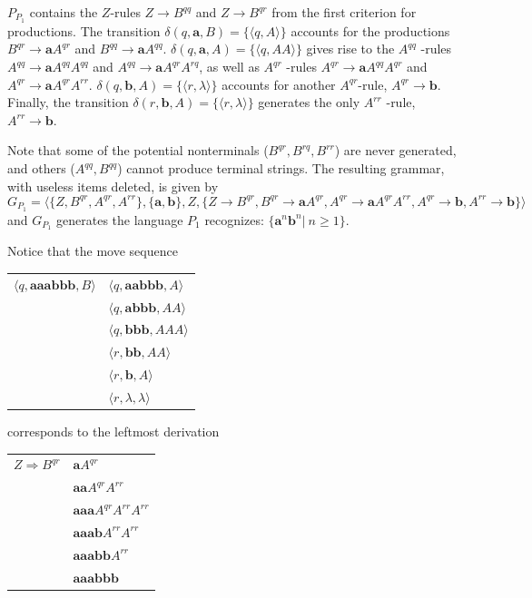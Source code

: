 $P_{P_1}$ contains the $Z$-rules $Z\rightarrow B^{qq}$ and $Z\rightarrow B^{qr}$
from the first criterion for productions. The transition $\delta(q,\pmb{a},B) =
\{\langle q,A\rangle\}$ accounts for the productions $B^{qr}\rightarrow\pmb{a}
A^{qr}$ and $B^{qq}\rightarrow\pmb{a}A^{qq}$. $\delta(q,\pmb{a},A)=\{\langle q,
AA\rangle\}$ gives rise to the $A^{qq}$ -rules $A^{qq}\rightarrow\pmb{a}A^{qq}A^{qq}$ and $A^{qq}\rightarrow\pmb{a}A^{qr}A^{rq}$, as well as $A^{qr}$ -rules
$A^{qr}\rightarrow\pmb{a}A^{qq}A^{qr}$ and $A^{qr}\rightarrow\pmb{a}A^{qr}A^{rr}$.
$\delta(q,\pmb{b},A)=\{\langle r,\lambda\rangle\}$ accounts for another
$A^{qr}$-rule, $A^{qr}\rightarrow\pmb{b}$. Finally, the transition $\delta(r,
\pmb{b},A)=\{\langle r,\lambda\rangle\}$ generates the only $A^{rr}$ -rule,
$A^{rr}\rightarrow\pmb{b}$.

Note that some of the potential nonterminals ($B^{qr} , B^{rq} , B^{rr}$) are never
generated, and others ($A^{qq} , B^{qq}$) cannot produce terminal strings. The
resulting grammar, with useless items deleted, is given by
\[ G_{P_1}=\langle\{Z,B^{qr},A^{qr},A^{rr}\},\{\pmb{a},\pmb{b}\},Z,\{Z
	\rightarrow B^{qr},B^{qr}\rightarrow\pmb{a}A^{qr},A^{qr}\rightarrow
	\pmb{a}A^{qr}A^{rr},A^{qr}\rightarrow\pmb{b},A^{rr}\rightarrow\pmb{b}\}
	\rangle \]
and $G_{P_1}$ generates the language $P_1$ recognizes: $\{\pmb{a}^n\pmb{b}^n|\ n
\geq 1\}$.

Notice that the move sequence
\begin{center}\begin{tabular}{r@{ $\vdash$ }l}
$\langle q,\pmb{aaabbb},B\rangle$ & $\langle q,\pmb{aabbb},A\rangle$ \\
& $\langle q,\pmb{abbb},AA\rangle$ \\
& $\langle q,\pmb{bbb},AAA\rangle$ \\
& $\langle r,\pmb{bb},AA\rangle$ \\
& $\langle r,\pmb{b},A\rangle$ \\
& $\langle r,\lambda,\lambda\rangle$
\end{tabular}\end{center}
corresponds to the leftmost derivation
\begin{center}\begin{tabular}{r@{ $\Rightarrow$ }l}
$Z\Rightarrow B^{qr}$ & $\pmb{a}A^{qr}$ \\
& $\pmb{aa}A^{qr}  A^{rr}$ \\
& $\pmb{aaa}A^{qr}  A^{rr}  A^{rr}$ \\
& $\pmb{aaab}A^{rr}  A^{rr}$ \\
& $\pmb{aaabb}A^{rr}$ \\
& $\pmb{aaabbb}$
\end{tabular}\end{center}

